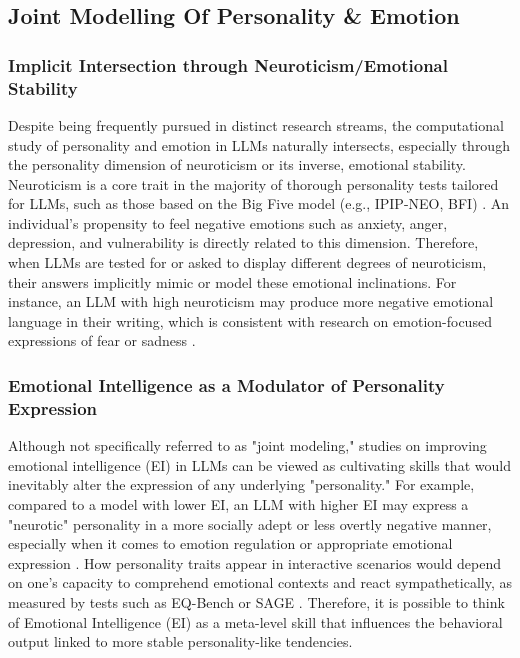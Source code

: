 \documentclass{DESSThesis}
\begin{document}
\subsection{Joint Modelling Of Personality \& Emotion}

\subsubsection{Implicit Intersection through Neuroticism/Emotional Stability}
Despite being frequently pursued in distinct research streams, the computational study of personality and emotion in LLMs naturally intersects, especially through the personality dimension of neuroticism or its inverse, emotional stability. Neuroticism is a core trait in the majority of thorough personality tests tailored for LLMs, such as those based on the Big Five model (e.g., IPIP-NEO, BFI) \cite{allbert_identifying_2025,bodroza_personality_2024,caron_manipulating_2023,gupta_self-assessment_2024,jiang_personallm_2024,lee_llms_2024,mao_editing_2024,safdari_personality_2023,suhr_challenging_2023,tommaso_llms_2024}. An individual's propensity to feel negative emotions such as anxiety, anger, depression, and vulnerability is directly related to this dimension. Therefore, when LLMs are tested for or asked to display different degrees of neuroticism, their answers implicitly mimic or model these emotional inclinations. For instance, an LLM with high neuroticism may produce more negative emotional language in their writing, which is consistent with research on emotion-focused expressions of fear or sadness \cite{chang_modeling_2024,liu_emollms_2024}.

\subsubsection{Emotional Intelligence as a Modulator of Personality Expression}
Although not specifically referred to as "joint modeling," studies on improving emotional intelligence (EI) in LLMs can be viewed as cultivating skills that would inevitably alter the expression of any underlying "personality." For example, compared to a model with lower EI, an LLM with higher EI may express a "neurotic" personality in a more socially adept or less overtly negative manner, especially when it comes to emotion regulation or appropriate emotional expression \cite{zhao_both_2024,sabour_emobench_2024}. How personality traits appear in interactive scenarios would depend on one's capacity to comprehend emotional contexts and react sympathetically, as measured by tests such as EQ-Bench or SAGE \cite{paech_eq-bench_2024,zhang_sentient_2025}. Therefore, it is possible to think of Emotional Intelligence (EI) as a meta-level skill that influences the behavioral output linked to more stable personality-like tendencies.
\end{document}
